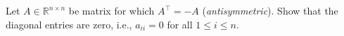 Let $A \in \mathbb{R}^{n \times n}$ be matrix for which $A^\top = - A$ (\textit{antisymmetric}). Show that the diagonal entries are zero, i.e.,  $a_{ii} = 0$ for all $1\leq i\leq n$.

